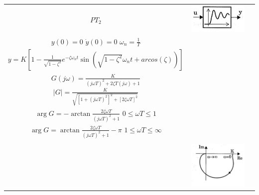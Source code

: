 \begin{longtable}{|c|c|l|}
			
			$PT_2$ &
			\begin{minipage}{3cm}
	        \includegraphics[width=3cm]{./bilder/PT2_glied.jpg}
	        \end{minipage}
			& \begin{minipage}{12cm}
              	$T^2\ddot{y}+2\zeta T \dot{y}+y=Ku \qquad \text{oder}
              	\qquad	\ddot{y}+2\zeta\omega_n \dot{y}+\omega_n^2y=K\omega_n^2
              	u$\\
              	$y(0)=0$ \hspace{10mm} $\dot{y}(0)=0$ \hspace{10mm}
              	$\omega_n=\frac{1}{T}$\\
              	$y=K \left[1-\frac{1}{\sqrt{1-\zeta^2}}e^{-\zeta\omega_n t}\sin
              	\left( \sqrt{1-\zeta^2} \omega_n t+arcos(\zeta) \right)
              	\right]$\\ 
              	$G(j \omega)= \frac{K}{(j \omega T)^2 + 2 \zeta T (j\omega) + 1}$
              	\hspace{10mm} 
              	$\left| G \right| = \frac{K}{\sqrt{\left[1+(j\omega
              	T)^2\right]^2+\left[2\zeta \omega T \right]^2}}$\\
              	$\arg G=-\arctan  \frac{2\zeta \omega T}{(j\omega T)^2+1}$
              	\hspace{13mm} $0 \leq\omega T \leq 1$\\
              	$\arg G=\arctan \frac{2\zeta \omega T}{(j \omega T)^2+1}-\pi$
              	\hspace{10mm} $1 \leq\omega T \leq \infty$\\
              \end{minipage} \rule[-2mm]{0mm}{22mm}
			\\ \cline{2-3}
			& \begin{minipage}{3cm}
	        \includegraphics[angle = {-0.3}, width=3cm]{./bilder/PT2_Nyq.jpg}
	        \end{minipage}
			& \begin{minipage}{12cm}

\end{minipage}
\end{longtable}
